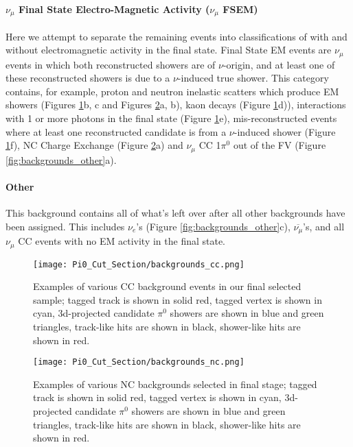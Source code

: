 \paragraph{ $\nu_\mu$ Final State Electro-Magnetic Activity ($\nu_\mu$ FSEM)}
Here we attempt to separate the remaining events into classifications of with and without electromagnetic activity in the final state.  Final State EM events are $\nu_\mu$ events in which both reconstructed showers are of $\nu$-origin, and at least one of these reconstructed showers is due to a $\nu$-induced true shower. This category contains, for example, proton and neutron inelastic scatters which produce EM showers (Figures \ref{fig:backgrounds_cc}b, c and Figures \ref{fig:backgrounds_nc}a, b), kaon decays (Figure \ref{fig:backgrounds_cc}d)),  interactions with 1 or more photons in the final state (Figure \ref{fig:backgrounds_cc}e), mis-reconstructed events where at least one reconstructed candidate is from a $\nu$-induced shower (Figure \ref{fig:backgrounds_cc}f), NC Charge Exchange (Figure \ref{fig:backgrounds_nc}a) and $\nu_\mu$ CC 1$\pi^0$ out of the FV (Figure \ref{fig:backgrounds_other}a).

\paragraph{Other}
This background contains all of what's left over after all other backgrounds have been assigned.  This includes $\nu_e$'s (Figure \ref{fig:backgrounds_other}c), $\overline{\nu_\mu}$'s, and all $\nu_\mu$ CC events with no EM activity in the final state.

\begin{figure}[H]
\centering
\texttt{[image: Pi0\_Cut\_Section/backgrounds\_cc.png]}
\caption{ Examples of various CC background events in our final selected sample; tagged track is shown in solid red, tagged vertex is shown in cyan, 3d-projected candidate $\pi^0$ showers are shown in blue and green triangles, track-like hits are shown in black, shower-like hits are shown in red. }
\label{fig:backgrounds_cc}
\end{figure}

\begin{figure}[H]
\centering
\texttt{[image: Pi0\_Cut\_Section/backgrounds\_nc.png]}
\caption{ Examples of various NC backgrounds selected in final stage; tagged track is shown in solid red, tagged vertex is shown in cyan, 3d-projected candidate $\pi^0$ showers are shown in blue and green triangles, track-like hits are shown in black, shower-like hits are shown in red. }
\label{fig:backgrounds_nc}
\end{figure}

